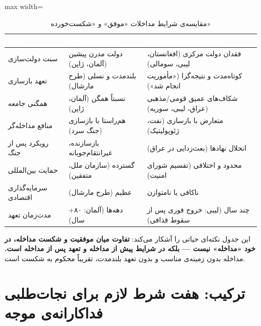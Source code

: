 \begin{table}[htbp]
\centering
\caption{مقایسه‌ی شرایط مداخلات «موفق» و «شکست‌خورده»}
\label{tab:ch15-success-failure}
\begin{adjustbox}{max width=\linewidth}
\begin{tabularx}{\linewidth}{
    >{\raggedleft\arraybackslash}p{3cm}
    >{\raggedleft\arraybackslash}X
    >{\raggedleft\arraybackslash}X
}
\toprule
\rowcolor{PrimaryDeep}
\textcolor{white}{\textbf{عامل}} &
\textcolor{white}{\textbf{مداخلات «موفق»}} &
\textcolor{white}{\textbf{مداخلات «شکست‌خورده»}} \\
\midrule
سنت دولت‌سازی & دولت مدرن پیشین (آلمان، ژاپن) & فقدان دولت مرکزی (افغانستان، لیبی، سومالی) \\
\rowcolor{NeutralLight}
تعهد بازسازی & بلندمدت و نسلی (طرح مارشال) & کوتاه‌مدت و نتیجه‌گرا («مأموریت انجام شد») \\
همگنی جامعه & نسبتاً همگن (آلمان، ژاپن) & شکاف‌های عمیق قومی/مذهبی (عراق، لیبی، سوریه) \\
\rowcolor{NeutralLight}
منافع مداخله‌گر & هم‌راستا با بازسازی (جنگ سرد) & متعارض با بازسازی (نفت، ژئوپولیتیک) \\
رویکرد پس از جنگ & بازسازنده، غیرانتقام‌جویانه & انحلال نهادها (بعث‌زدایی در عراق) \\
\rowcolor{NeutralLight}
حمایت بین‌المللی & گسترده (سازمان ملل، متفقین) & محدود و اختلافی (تقسیم شورای امنیت) \\
سرمایه‌گذاری اقتصادی & عظیم (طرح مارشال) & ناکافی یا نامتوازن \\
\rowcolor{NeutralLight}
مدت‌زمان تعهد & دهه‌ها (آلمان: ۸۰+ سال) & چند سال (لیبی: خروج فوری پس از سقوط قذافی) \\
\bottomrule
\end{tabularx}
\end{adjustbox}
\end{table}

این جدول نکته‌ای حیاتی را آشکار می‌کند: \textbf{تفاوت میان موفقیت و شکست مداخله، در خود «مداخله» نیست — بلکه در شرایط پیش از مداخله و تعهد پس از مداخله است.} مداخله بدون زمینه‌ی مناسب و بدون تعهد بلندمدت، تقریباً محکوم به شکست است.


\section{ترکیب: هفت شرط لازم برای نجات‌طلبی فداکارانه‌ی موجه}
\label{sec:ch15-conditions}

